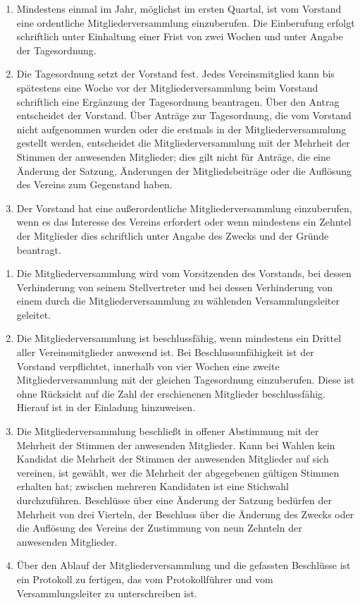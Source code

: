 \documentclass{scrartcl}
\begin{document}
\begin{contract}
\Clause[title={Einberufung der Mitgliederversammlung}]
\begin{enumerate}
    \item  Mindestens einmal im Jahr, möglichst im ersten Quartal, ist vom Vorstand eine ordentliche Mitgliederversammlung einzuberufen. Die Einberufung erfolgt schriftlich unter Einhaltung einer Frist von zwei Wochen und unter Angabe der Tagesordnung.
    \item Die Tagesordnung setzt der Vorstand fest. Jedes Vereinsmitglied kann bis spätestens eine Woche vor der Mitgliederversammlung beim Vorstand schriftlich eine Ergänzung der Tagesordnung beantragen. Über den Antrag entscheidet der Vorstand. Über Anträge zur  Tagesordnung, die vom Vorstand nicht aufgenommen wurden oder die erstmals in der     Mitgliederversammlung gestellt werden, entscheidet die Mitgliederversammlung mit der Mehrheit der Stimmen der anwesenden Mitglieder; dies gilt nicht für Anträge, die eine Änderung der Satzung, Änderungen der Mitgliedsbeiträge oder die Auflösung des Vereins zum Gegenstand haben.
    \item Der Vorstand hat eine außerordentliche Mitgliederversammlung einzuberufen, wenn es das Interesse des Vereins erfordert oder wenn mindestens ein Zehntel der Mitglieder dies schriftlich unter Angabe des Zwecks und der Gründe beantragt.
\end{enumerate}

\Clause[title={Beschlussfassung der Mitgliederversammlung}]
\begin{enumerate}
    \item Die Mitgliederversammlung wird vom Vorsitzenden des Vorstands, bei dessen Verhinderung von seinem Stellvertreter und bei dessen Verhinderung von einem durch die Mitgliederversammlung zu wählenden Versammlungsleiter geleitet.
    \item Die Mitgliederversammlung ist beschlussfähig, wenn mindestens ein Drittel aller Vereinsmitglieder anwesend ist. Bei Beschlussunfähigkeit ist der Vorstand verpflichtet, innerhalb von vier Wochen eine zweite Mitgliederversammlung mit der gleichen Tagesordnung einzuberufen. Diese ist ohne Rücksicht auf die Zahl der erschienenen  Mitglieder beschlussfähig. Hierauf ist in der Einladung hinzuweisen.
    \item Die Mitgliederversammlung beschließt in offener Abstimmung mit der Mehrheit der Stimmen der anwesenden Mitglieder. Kann bei Wahlen kein Kandidat die Mehrheit der Stimmen der anwesenden Mitglieder auf sich vereinen, ist gewählt, wer die Mehrheit der abgegebenen gültigen Stimmen erhalten hat; zwischen mehreren Kandidaten ist eine Stichwahl durchzuführen. Beschlüsse über eine Änderung der Satzung bedürfen der Mehrheit von drei Vierteln, der Beschluss über die Änderung des Zwecks oder die Auflösung des Vereins der Zustimmung von neun Zehnteln der anwesenden Mitglieder.
    \item Über den Ablauf der Mitgliederversammlung und die gefassten Beschlüsse ist ein Protokoll zu fertigen, das vom Protokollführer und vom Versammlungsleiter zu unterschreiben ist.
\end{enumerate}

\end{contract}
\end{document}

